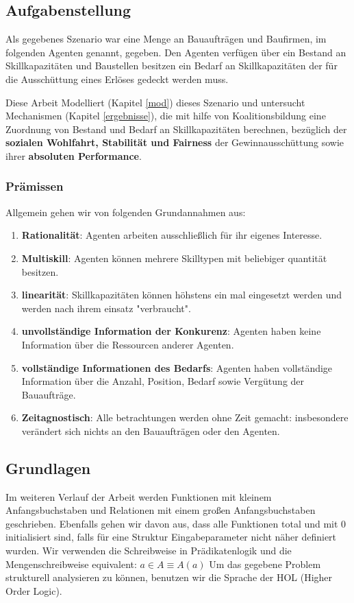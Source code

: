\subsection{Aufgabenstellung}
\label{task}
Als gegebenes Szenario war eine Menge an Bauaufträgen und Baufirmen, im folgenden Agenten genannt, gegeben. Den Agenten verfügen über ein Bestand an Skillkapazitäten und Baustellen besitzen ein Bedarf an Skillkapazitäten der für die Ausschüttung eines Erlöses gedeckt werden muss.

Diese Arbeit Modelliert (Kapitel \ref{mod}) dieses Szenario und untersucht Mechanismen (Kapitel \ref{ergebnisse}), die mit hilfe von Koalitionsbildung eine Zuordnung von Bestand und Bedarf an Skillkapazitäten berechnen, bezüglich der \textbf{sozialen Wohlfahrt, Stabilität und Fairness} der Gewinnausschüttung sowie ihrer \textbf{absoluten Performance}.

\subsubsection*{Prämissen}
Allgemein gehen wir von folgenden Grundannahmen aus:

\begin{enumerate}
  \item \textbf{Rationalität}: Agenten arbeiten ausschließlich für ihr eigenes Interesse.
  \item \textbf{Multiskill}: Agenten können mehrere Skilltypen mit beliebiger quantität besitzen.
  \item \textbf{linearität}: Skillkapazitäten können höhstens ein mal eingesetzt werden und werden nach ihrem einsatz "verbraucht".
  \item \textbf{unvollständige Information der Konkurenz}: Agenten haben keine Information über die Ressourcen anderer Agenten.
  \item \textbf{vollständige Informationen des Bedarfs}: Agenten haben vollständige Information über die Anzahl, Position, Bedarf sowie Vergütung der Bauaufträge.
  \item \textbf{Zeitagnostisch}: Alle betrachtungen werden ohne Zeit gemacht: insbesondere verändert sich nichts an den Bauaufträgen oder den Agenten.
\end{enumerate}

\subsection{Grundlagen}
\label{basics}
  Im weiteren Verlauf der Arbeit werden Funktionen mit kleinem Anfangsbuchstaben und Relationen mit einem großen Anfangsbuchstaben geschrieben. Ebenfalls gehen wir davon aus, dass alle Funktionen total und mit 0 initialisiert sind, falls für eine Struktur Eingabeparameter nicht näher definiert wurden. Wir verwenden die Schreibweise in Prädikatenlogik und die Mengenschreibweise equivalent: $a\in A \equiv A(a)$
  Um das gegebene Problem strukturell analysieren zu können, benutzen wir die Sprache der HOL (Higher Order Logic).
